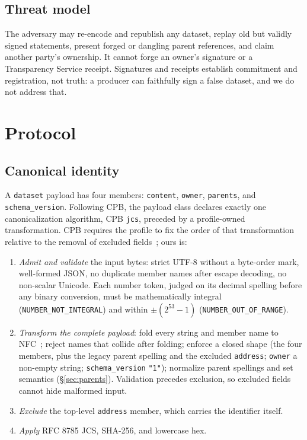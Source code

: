 \documentclass[conference]{IEEEtran}
\begin{document}
\subsection{Threat model}
The adversary may re-encode and republish any dataset, replay old but validly signed statements, present forged or dangling parent references, and claim another party's ownership. It cannot forge an owner's signature or a Transparency Service receipt. Signatures and receipts establish commitment and registration, not truth: a producer can faithfully sign a false dataset, and we do not address that.

\section{Protocol}

\subsection{Canonical identity}
A \texttt{dataset} payload has four members: \texttt{content}, \texttt{owner}, \texttt{parents}, and \texttt{schema\_version}. Following CPB, the payload class declares exactly one canonicalization algorithm, CPB \texttt{jcs}, preceded by a profile-owned transformation. CPB requires the profile to fix the order of that transformation relative to the removal of excluded fields~\cite{cpb03}; ours is:
\begin{enumerate}
\item \emph{Admit and validate} the input bytes: strict UTF-8 without a byte-order mark, well-formed JSON, no duplicate member names after escape decoding, no non-scalar Unicode. Each number token, judged on its decimal spelling before any binary conversion, must be mathematically integral (\texttt{NUMBER\_NOT\_INTEGRAL}) and within $\pm(2^{53}-1)$ (\texttt{NUMBER\_OUT\_OF\_RANGE}).
\item \emph{Transform the complete payload}: fold every string and member name to NFC~\cite{uax15}; reject names that collide after folding; enforce a closed shape (the four members, plus the legacy parent spelling and the excluded \texttt{address}; \texttt{owner} a non-empty string; \texttt{schema\_version} \texttt{"1"}); normalize parent spellings and set semantics (\S\ref{sec:parents}). Validation precedes exclusion, so excluded fields cannot hide malformed input.
\item \emph{Exclude} the top-level \texttt{address} member, which carries the identifier itself.
\item \emph{Apply} RFC 8785 JCS, SHA-256, and lowercase hex.
\end{enumerate}
\end{document}
